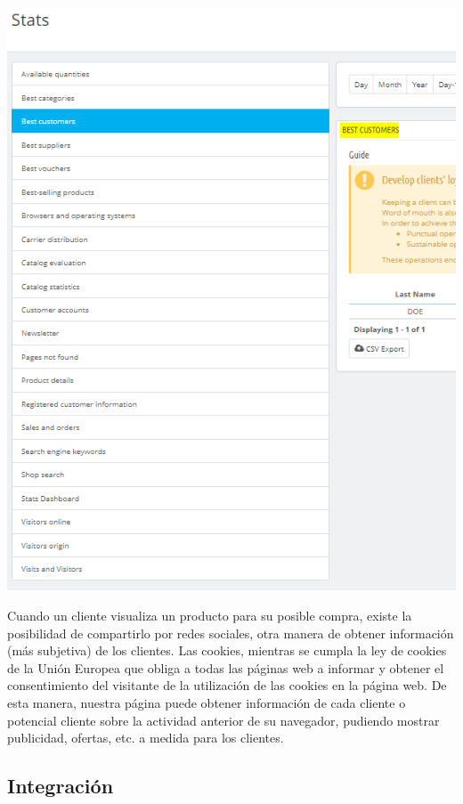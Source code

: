 \documentclass{article}
\begin{document}
\begin{center}
\includegraphics[scale=0.5]{images/personalizacion.png}
\end{center}

Cuando un cliente visualiza un producto para su posible compra, existe la posibilidad de compartirlo por redes sociales, otra manera de obtener información (más subjetiva) de los clientes.
Las cookies, mientras se cumpla la ley de cookies de la Unión Europea que obliga a todas las páginas web a informar y obtener el consentimiento del visitante de la utilización de las cookies en la página web. De esta manera, nuestra página puede obtener información de cada cliente o potencial cliente sobre la actividad anterior de su navegador, pudiendo mostrar publicidad, ofertas, etc. a medida para los clientes.

\subsection{Integración}
\end{document}
